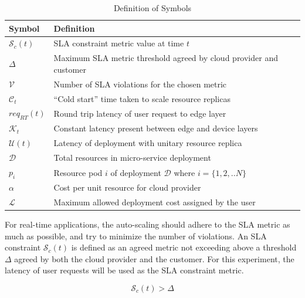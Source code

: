 \begin{table}
    \caption{Definition of Symbols}\label{tab:lstm-params}
    \centering
    \begin{tabular}{|l l|}
        \hline
        Symbol & Definition\\
        \hline
        $\mathcal{S}_{c}(t)$ & SLA constraint metric value at time $t$\\
        $\Delta$ & Maximum SLA metric threshold agreed by cloud provider and customer\\
        $\mathcal{V}$ & Number of SLA violations for the chosen metric\\
        $\mathcal{C}_{t}$ & ``Cold start'' time taken to scale resource replicas\\
        $req_{RT}(t)$ & Round trip latency of user request to edge layer\\
        $\mathcal{K}_{t}$ & Constant latency present between edge and device layers\\
        $\mathcal{U}(t)$ & Latency of deployment with unitary resource replica\\
        $\mathcal{D}$ & Total resources in micro-service deployment\\
        $p_{i}$ & Resource pod $i$ of deployment $\mathcal{D}$ where $i = \{1, 2, .. N\}$\\
        $\alpha$ & Cost per unit resource for cloud provider\\
        $\mathcal{L}$ & Maximum allowed deployment cost assigned by the user\\
        \hline
    \end{tabular}
\end{table}

For real-time applications, the auto-scaling should adhere to the SLA metric as much as possible, and try to minimize the number of violations. An SLA constraint $\mathcal{S}_{c}(t)$ is defined as an agreed metric not exceeding above a threshold $\Delta$ agreed by both the cloud provider and the customer. For this experiment, the latency of user requests will be used as the SLA constraint metric.

\begin{equation}
    \mathcal{S}_{c}(t) > \Delta
\end{equation}

